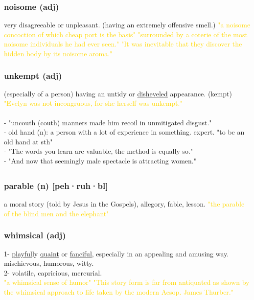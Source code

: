 \documentclass{proc}
\begin{document}
	\subsubsection{\textcolor{brickred}{noisome} (adj)}
	very disagreeable or unpleasant. (having an extremely offensive smell.)
	\textcolor{gold}{"a noisome concoction of which cheap port is the basis" "surrounded by a coterie of  the most noisome individuals he had ever seen." "It was inevitable that they discover the hidden body by its noisome aroma."}
	
	\subsubsection{\textcolor{brickred}{unkempt} (adj)}
	(especially of a person) having an untidy or \underline{disheveled} appearance. (kempt)
	\textcolor{gold}{"Evelyn was not incongruous, for she herself was unkempt."}\\\\
	- "uncouth (couth) manners made him recoil in unmitigated disgust."\\
	- old hand (n): a person with a lot of experience in something. expert.
	"to be an old hand at sth"\\
	- "The words you learn are valuable, the method is equally so."\\
	- "And now that seemingly male spectacle is attracting women."
	
	\newpage
	\setcounter{section}{35}
	\setcounter{subsection}{0}
	
	
	\subsection{}
	\subsubsection{\textcolor{brickred}{parable} (n) [peh·ruh·bl]}
	a moral story (told by Jesus in the Gospels), allegory, fable, lesson.
	\textcolor{gold}{"the parable of the blind men and the elephant"}
	
	\subsubsection{\textcolor{brickred}{whimsical} (adj)}
	1- \underline{playful}ly \underline{quaint} or \underline{fanciful}, especially in an appealing and amusing way. mischievous, humorous, witty.\\
	2- volatile, capricious, mercurial.\\
	\textcolor{gold}{"a whimsical sense of humor" "This story form is far from antiquated as shown by the whimsical approach to life taken by the modern Aesop. James Thurber."}
	
\end{document}

